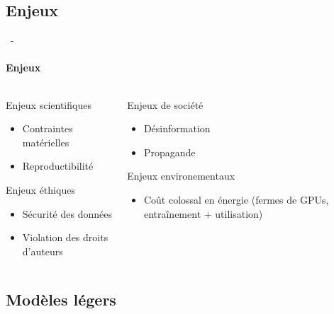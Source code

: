 \documentclass[aspectratio=169, 22pt]{beamer}
\begin{document}
\subsection{Enjeux}
\begin{frame}{\secname~- \subsecname}
  \framesubtitle{Enjeux}
  \begin{columns}
    \begin{column}{0.5\linewidth}
      \begin{customblock}{Enjeux scientifiques}
        \begin{itemize}
        \item Contraintes matérielles
        \item Reproductibilité
        \end{itemize}
      \end{customblock}
      \pause
      \begin{block}{Enjeux éthiques}
        \begin{itemize}
        \item Sécurité des données
        \item Violation des droits d'auteurs
        \end{itemize}
      \end{block}
    \end{column}
    \begin{column}{0.5\linewidth}
      \pause
      \begin{alertblock}{Enjeux de société}
        \begin{itemize}
        \item Désinformation
        \item Propagande
        \end{itemize}
      \end{alertblock}
      \pause
      \begin{exampleblock}{Enjeux environementaux}
        \begin{itemize}
        \item Coût colossal en énergie (fermes de GPUs, entraînement + utilisation)
        \end{itemize}
      \end{exampleblock}
    \end{column}
  \end{columns}
\end{frame}

\subsection{Modèles légers}
\end{document}
